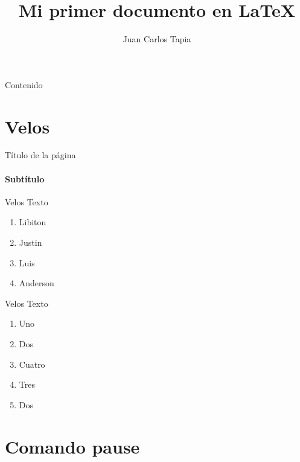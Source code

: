\documentclass[11pt]{beamer}
\begin{document}
\justifying
\author{Juan Carlos Tapia}
\title{Mi primer documento en \LaTeX}



\begin{frame}[plain]
\maketitle
\end{frame}



\begin{frame}{Contenido}
\tableofcontents
\end{frame}





\section{Velos}

\begin{frame}{Título de la página}
\framesubtitle{Subtítulo}
\lipsum[1]
\end{frame}


\begin{frame}{Velos}
Texto
\begin{enumerate}[<+->]
\item Libiton
\item Justin
\item Luis
\item Anderson
\end{enumerate}
\end{frame}

\begin{frame}{Velos}  %
Texto
\begin{enumerate}
\item<1-> Uno
\item<2-> Dos
\item<4-> Cuatro
\item<3-> Tres
\item<2-> Dos
\end{enumerate}
\end{frame}
\section{Comando pause}
\end{document}
